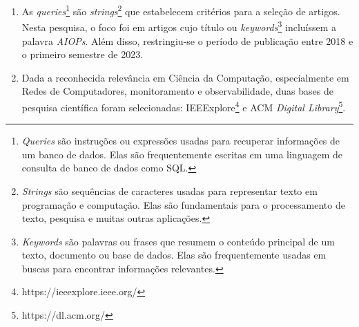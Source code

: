 \begin{enumerate}
    
    \item As \textit{queries}\footnote{\textit{Queries} são instruções ou expressões usadas para recuperar informações de um banco de dados. Elas são frequentemente escritas em uma linguagem de consulta de banco de dados como SQL.} são \textit{strings}\footnote{\textit{Strings} são sequências de caracteres usadas para representar texto em programação e computação. Elas são fundamentais para o processamento de texto, pesquisa e muitas outras aplicações.}
 que estabelecem critérios para a seleção de artigos. Nesta pesquisa, o foco foi em artigos cujo título ou \textit{keywords}\footnote{\textit{Keywords} são palavras ou frases que resumem o conteúdo principal de um texto, documento ou base de dados. Elas são frequentemente usadas em buscas para encontrar informações relevantes.}
 incluíssem a palavra \textit{AIOPs}. Além disso, restringiu-se o período de publicação entre 2018 e o primeiro semestre de 2023.
    
    \item Dada a reconhecida relevância em Ciência da Computação, especialmente em Redes de Computadores, monitoramento e observabilidade, duas bases de pesquisa científica foram selecionadas: IEEExplore\footnote{https://ieeexplore.ieee.org/} e ACM \textit{Digital Library}\footnote{https://dl.acm.org/}.
    

\end{enumerate}
